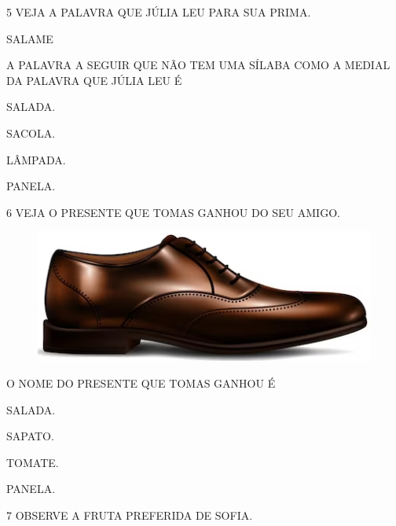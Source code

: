 \pagebreak

\num{5} VEJA A PALAVRA QUE JÚLIA LEU PARA SUA PRIMA.

\begin{myquote}
\centering\LARGE{SALAME}
\end{myquote}

A PALAVRA A SEGUIR QUE NÃO TEM UMA SÍLABA COMO A MEDIAL
DA PALAVRA QUE JÚLIA LEU É

\begin{escolha}%
\item SALADA.

\item SACOLA.

\item LÂMPADA.

\item PANELA.
\end{escolha}

\num{6} VEJA O PRESENTE QUE TOMAS GANHOU DO SEU AMIGO.

\begin{figure}[H]
\centering
\includegraphics[width=.7\textwidth]{media/image191.png}
\end{figure}

O NOME DO PRESENTE QUE TOMAS GANHOU É

\begin{escolha}%
\item SALADA.

\item SAPATO.

\item TOMATE.

\item PANELA.
\end{escolha}

\vspace{0.3cm}

\num{7} OBSERVE A FRUTA PREFERIDA DE SOFIA.

